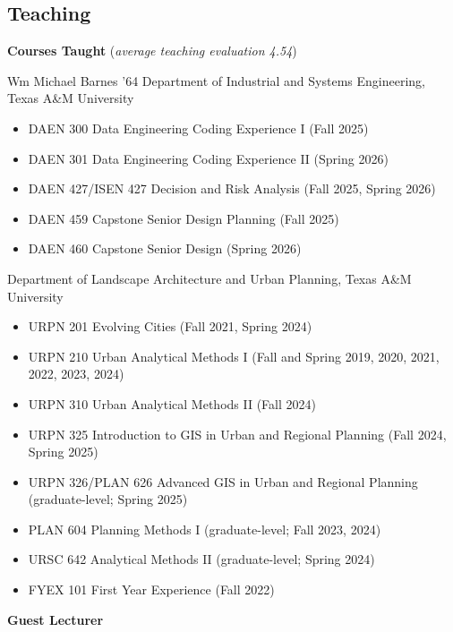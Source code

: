 \documentclass[11pt,oneside]{article}
\begin{document}
\subsection*{Teaching}

\textbf{Courses Taught} (\emph{average teaching evaluation 4.54})

\vspace{3pt}

{Wm Michael Barnes ’64 Department of Industrial and Systems Engineering, Texas A\&M University}
\begin{itemize}[leftmargin=20pt]
\item DAEN 300 Data Engineering Coding Experience I (Fall 2025)
\item DAEN 301 Data Engineering Coding Experience II (Spring 2026)
\item DAEN 427/ISEN 427 Decision and Risk Analysis (Fall 2025, Spring 2026)
\item DAEN 459 Capstone Senior Design Planning (Fall 2025)
\item DAEN 460 Capstone Senior Design (Spring 2026)
\end{itemize}

{Department of Landscape Architecture and Urban Planning, Texas A\&M University}
\begin{itemize}[leftmargin=20pt]
\item URPN 201 Evolving Cities (Fall 2021, Spring 2024)
\item URPN 210 Urban Analytical Methods I (Fall and Spring 2019, 2020, 2021, 2022, 2023, 2024)
\item URPN 310 Urban Analytical Methods II (Fall 2024)
\item URPN 325 Introduction to GIS in Urban and Regional Planning (Fall 2024, Spring 2025)
\item URPN 326/PLAN 626 Advanced GIS in Urban and Regional Planning (graduate-level; Spring 2025)
\item PLAN 604 Planning Methods I (graduate-level; Fall 2023, 2024)
\item URSC 642 Analytical Methods II (graduate-level; Spring 2024)
\item FYEX 101 First Year Experience (Fall 2022)
\end{itemize}

\vspace{3pt}

\textbf{Guest Lecturer}

\vspace{3pt}
\end{document}
